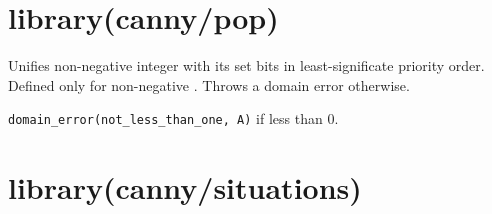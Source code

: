 \chapter{library(canny/pop)}\label{sec:pop}

\begin{description}
Unifies non-negative integer  with its set bits  in
least-significate priority order. Defined only for non-negative .
Throws a domain error otherwise.

\begin{tags}
\verb$domain_error(not_less_than_one, A)$ if  less than 0.
\end{tags}
\end{description}

\chapter{library(canny/situations)}\label{sec:situations}

